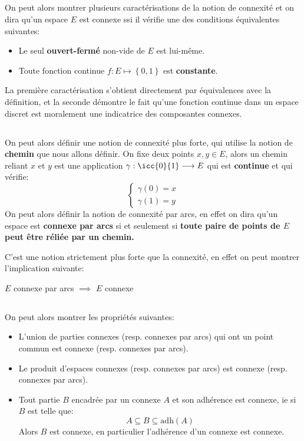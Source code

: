 \subsection*{}
On peut alors montrer plusieurs caractérisations de la notion de connexité et on dira qu'un espace \( E \) est connexe ssi il vérifie une des conditions équivalentes suivantes:
\begin{itemize}
   \item Le seul \textbf{ouvert-fermé} non-vide de \( E \) est lui-même.
   \item Toute fonction continue \( f : E \longmapsto \left\{ 0, 1 \right\}  \) est \textbf{constante}.
\end{itemize}
La première caractérisation s'obtient directement par équivalences avec la définition, et la seconde démontre le fait qu'une fonction continue dans un espace discret est moralement une indicatrice des composantes connexes.
\subsection*{}
On peut alors définir une notion de connexité plus forte, qui utilise la notion de \textbf{chemin} que nous allons définir. On fixe deux points \(x, y \in E\), alors un chemin reliant \(x\) et \(y\) est une application \(\gamma: \icc{0}{1} \longrightarrow E\) qui est \textbf{continue} et qui vérifie:
\[
   \begin{cases}
      \gamma(0) = x \\
      \gamma(1) = y
   \end{cases}
\]
On peut alors définir la notion de connexité par arcs, en effet on dira qu'un espace est \textbf{connexe par arcs} si et seulement si \textbf{toute paire de points de \(E\) peut être réliée par un chemin.}\<

C'est une notion strictement plus forte que la connexité, en effet on peut montrer l'implication suivante:
\begin{center}
   \(E\) connexe par arcs \(\implies\) \(E\) connexe
\end{center}
\subsection*{}
On peut alors montrer les propriétés suivantes:
\begin{itemize}
   \item L'union de parties connexes (resp. connexes par arcs) qui ont un point commun est connexe (resp. connexes par arcs).
   \item Le produit d'espaces connexes (resp. connexes par arcs) est connexe (resp. connexes par arcs).
   \item Tout partie \( B \) encadrée par un connexe \( A \) et son adhérence est connexe, ie si \( B \) est telle que:
   \[ 
      A \subseteq B \subseteq \text{adh}(A) 
   \]
   Alors \( B \) est connexe, en particulier l'adhérence d'un connexe est connexe.
\end{itemize}
